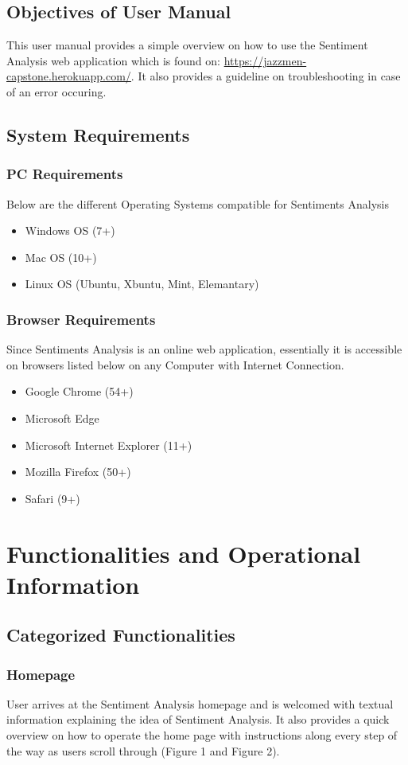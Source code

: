 \documentclass[12pt, titlepage]{article}
\begin{document}
\subsection{Objectives of User Manual}
This user manual provides a simple overview on how to use the Sentiment Analysis web application which is found on: \url{https://jazzmen-capstone.herokuapp.com/}. It also provides a guideline on troubleshooting in case of an error occuring. 

\subsection{System Requirements}
\subsubsection{PC Requirements}
Below are the different Operating Systems compatible for Sentiments Analysis
\begin{itemize}
	\item Windows OS (7+)
	\item Mac OS (10+)
	\item Linux OS (Ubuntu, Xbuntu, Mint, Elemantary)
\end{itemize}
\subsubsection{Browser Requirements}
Since Sentiments Analysis is an online web application, essentially it is accessible on browsers listed below on any Computer with Internet Connection.
\begin{itemize}
	\item Google Chrome (54+)
	\item Microsoft Edge
	\item Microsoft Internet Explorer (11+)
	\item Mozilla Firefox (50+)
	\item Safari (9+)
\end{itemize}

\section{Functionalities and Operational Information}
\subsection{Categorized Functionalities}
\subsubsection{Homepage}
User arrives at the Sentiment Analysis homepage and is welcomed with textual information explaining the idea of Sentiment Analysis. It also provides a quick overview on how to operate the home page with instructions along every step of the way as users scroll through (Figure 1 and Figure 2). 
\end{document}
